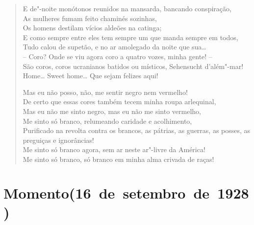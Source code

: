 \begin{verse}
E de"-noite monótonos reunidos na mansarda, bancando conspiração,\\
As mulheres fumam feito chaminés sozinhas,\\
Os homens destilam vícios aldeões na catinga;\\
E como sempre entre eles tem sempre um que manda sempre em todos,\\
Tudo calou de supetão, e no ar amolegado da noite que sua\ldots{}\\
-- Coro? Onde se viu agora coro a quatro vozes, minha gente! --\\
São coros, coros ucranianos batidos ou místicos, Sehensucht d'além"-mar!\\
Home\ldots{} Sweet home\ldots{} Que sejam felizes aqui!

Mas eu não posso, não, me sentir negro nem vermelho!\\
De certo que essas cores também tecem minha roupa arlequinal,\\
Mas eu não me sinto negro, mas eu não me sinto vermelho,\\
Me sinto só branco, relumeando caridade e acolhimento,\\
Purificado na revolta contra os brancos, as pátrias, as guerras, as posses, as
preguiças e ignorâncias!\\
Me sinto só branco agora, sem ar neste ar"-livre da América!\\
Me sinto só branco, só branco em minha alma crivada de raças!
\end{verse}

\pagebreak
{}
\section*{Momento\break (16~de~setembro~de~1928)}


